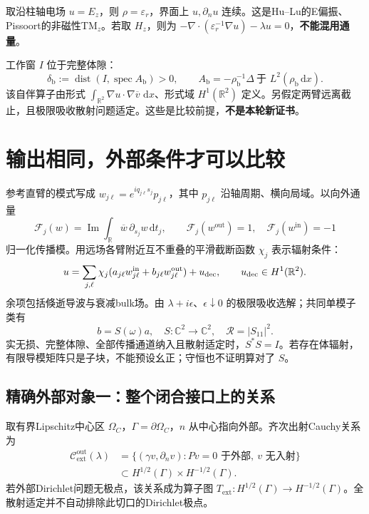 \documentclass[UTF8,fontset=none,11pt,a4paper]{ctexart}
\newcommand{\R}{\mathbb R}\newcommand{\C}{\mathbb C}
\newcommand{\dd}{\,\mathrm d}\newcommand{\spec}{\operatorname{spec}}
\newcommand{\dist}{\operatorname{dist}}\newcommand{\out}{\mathrm{out}}
\newcommand{\inn}{\mathrm{in}}\newcommand{\ext}{\mathrm{ext}}
\newcommand{\bulk}{\mathrm{b}}
\newcommand{\nextpage}{\clearpage}
\begin{document}
取沿柱轴电场 $u=E_z$，则 $\rho=\varepsilon_r$，界面上 $u,\partial_nu$ 连续。这是Hu--Lu的E偏振、Pissoort的非磁性TM$_z$。若取 $H_z$，则为
\( -\nabla\!\cdot(\varepsilon_r^{-1}\nabla u)-\lambda u=0\)，\textbf{不能混用通量}。

工作窗 $I$ 位于完整体隙：
\begin{equation}\label{eq:gap}
 \delta_\bulk:=\dist(I,\spec A_\bulk)>0,\qquad
 A_\bulk=-\rho_\bulk^{-1}\Delta\ \text{于 }L^2(\rho_\bulk\dd x).
\end{equation}
该自伴算子由形式 $\int_{\R^2}\nabla u\cdot\nabla\overline v\,\dd x$、形式域 $H^1(\R^2)$ 定义。另假定两臂远离截止，且极限吸收散射问题适定。这些是比较前提，\textbf{不是本轮新证书}。

\nextpage
\section{输出相同，外部条件才可以比较}
参考直臂的模式写成 $w_{j\ell}=e^{iq_{j\ell}s_j}p_{j\ell}$，其中 $p_{j\ell}$ 沿轴周期、横向局域。以向外通量
\begin{equation}
 \mathcal F_j(w)=\operatorname{Im}\int_\R\overline w\,\partial_{s_j}w\dd t_j,
 \qquad\mathcal F_j(w^{\out})=1,\quad\mathcal F_j(w^{\inn})=-1
\end{equation}
归一化传播模。用远场各臂附近互不重叠的平滑截断函数 $\chi_j$ 表示辐射条件：
\begin{equation}\label{eq:rad}
 u=\sum_{j,\ell}\chi_j(a_{j\ell}w_{j\ell}^{\inn}
          +b_{j\ell}w_{j\ell}^{\out})+u_{\rm dec},\qquad u_{\rm dec}\in H^1(\R^2).
\end{equation}
余项包括倏逝导波与衰减bulk场。由 $\lambda+i\epsilon$、$\epsilon\downarrow0$ 的极限吸收选解；共同单模子类有
\begin{equation}\label{eq:scattering}
 \boxed{\ b=S(\omega)a,\quad S:\C^2\to\C^2,\quad \mathcal R=|S_{11}|^2.\ }
\end{equation}
实无损、完整体隙、全部传播通道纳入且散射适定时，$S^*S=I$。若存在体辐射，有限导模矩阵只是子块，不能预设幺正；守恒也不证明算对了 $S$。

\subsection*{精确外部对象一：整个闭合接口上的关系}
取有界Lipschitz中心区 $\Omega_C$，$\Gamma=\partial\Omega_C$，$n$ 从中心指向外部。齐次出射Cauchy关系为
\begin{equation}
 \begin{aligned}
 \mathscr C_\ext^{\out}(\lambda)
 &=\{(\gamma v,\partial_nv):Pv=0\text{ 于外部},\ v\text{ 无入射}\}\\
 &\subset H^{1/2}(\Gamma)\times H^{-1/2}(\Gamma).
 \end{aligned}
\end{equation}
若外部Dirichlet问题无极点，该关系成为算子图
\(T_\ext:H^{1/2}(\Gamma)\to H^{-1/2}(\Gamma)\)。全散射适定并不自动排除此切口的Dirichlet极点。
\end{document}
